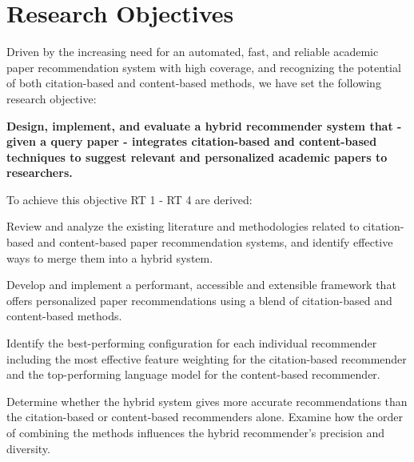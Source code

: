 \section{Research Objectives} \label{sec:research-objectives}

Driven by the increasing need for an automated, fast, and reliable academic paper recommendation system with high coverage, and recognizing the potential of both citation-based and content-based methods, we have set the following research objective:

\textbf{Design, implement, and evaluate a hybrid recommender system that - given a query paper - integrates citation-based and content-based techniques to suggest relevant and personalized academic papers to researchers.}

To achieve this objective \ac{RT} 1 - \acl{RT} 4 are derived:

\begin{description}[leftmargin=!, labelwidth=\widthof{\bfseries RT 10:}]
    \item[RT 1:] Review and analyze the existing literature and methodologies related to citation-based and content-based paper recommendation systems, and identify effective ways to merge them into a hybrid system.
    \item[RT 2:] Develop and implement a performant, accessible and extensible framework that offers personalized paper recommendations using a blend of citation-based and content-based methods.
    \item[RT 3:] Identify the best-performing configuration for each individual recommender including the most effective feature weighting for the citation-based recommender and the top-performing language model for the content-based recommender.
    \item[RT 4:] Determine whether the hybrid system gives more accurate recommendations than the citation-based or content-based recommenders alone. Examine how the order of combining the methods influences the hybrid recommender's precision and diversity.
\end{description}
